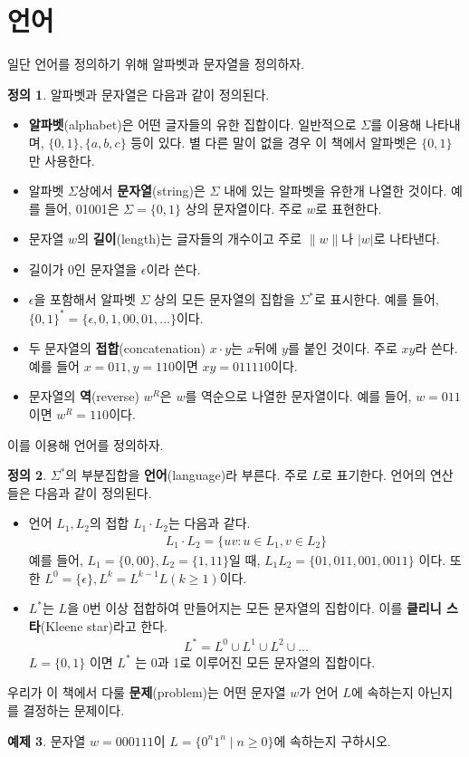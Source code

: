 \documentclass[b5paper, 11pt]{book}
\theoremstyle{definition}
\newtheorem{defn}{정의}[chapter]
\newtheorem{ex}[defn]{예제}
\begin{document}
\section{언어}
일단 언어를 정의하기 위해 알파벳과 문자열을 정의하자.
\begin{defn}
    알파벳과 문자열은 다음과 같이 정의된다.
    \begin{itemize}
        \item \textbf{알파벳}(alphabet)은 어떤 글자들의 유한 집합이다. 일반적으로 $\Sigma$를 이용해 나타내며, $\{0, 1\}, \{a, b, c\}$ 등이 있다. 별 다른 말이 없을 경우 이 책에서 알파벳은 $\{0, 1\}$만 사용한다. 
        \item 알파벳 $\Sigma$상에서 \textbf{문자열}(string)은 $\Sigma$ 내에 있는 알파벳을 유한개 나열한 것이다. 예를 들어, 01001은 $\Sigma = \{0, 1\}$ 상의 문자열이다. 주로 $w$로 표현한다. 
        \item 문자열 $w$의 \textbf{길이}(length)는 글자들의 개수이고 주로 $\| w \|$나 $\vert w \vert$로 나타낸다.
        \item 길이가 0인 문자열을 $\epsilon$이라 쓴다. 
        \item $\epsilon$을 포함해서 알파벳 $\Sigma$ 상의 모든 문자열의 집합을 $\Sigma^*$로 표시한다. 예를 들어, $\{0, 1\}^{*} = \{\epsilon , 0, 1, 00, 01 , \ldots \}$이다.
        \item 두 문자열의 \textbf{접합}(concatenation) $x \cdot y$는 $x$뒤에 $y$를 붙인 것이다. 주로 $xy$라 쓴다. 예를 들어 $x = 011, y = 110$이면 $xy = 011110$이다. 
        \item 문자열의 \textbf{역}(reverse) $w^R$은 $w$를 역순으로 나열한 문자열이다. 예를 들어, $w=011$이면 $w^R=110$이다.
    \end{itemize}
\end{defn}
이를 이용해 언어를 정의하자.
\begin{defn}
$\Sigma^*$의 부분집합을 \textbf{언어}(language)라 부른다. 주로 $L$로 표기한다. 언어의 연산들은 다음과 같이 정의된다.
\begin{itemize}
    \item 언어 $L_1, L_2$의 접합 $L_1 \cdot L_2$는 다음과 같다.
    \begin{align*}
       L_1 \cdot L_2 = \{uv: u \in L_1, v \in L_2\} 
    \end{align*}
    예를 들어, $L_1 = \{0, 00\}, L_2 = \{1, 11\}$일 때, $L_1 L_2 = \{01, 011, 001, 0011\}$ 이다. 또한 $L^0 = \{ \epsilon\}, L^{k} = L^{k-1} L (k \ge 1)$이다.  
    \item $L^*$는 $L$을 0번 이상 접합하여 만들어지는 모든 문자열의 집합이다. 이를 \textbf{클리니 스타}(Kleene star)라고 한다.
    \begin{align*}
        L^* = L^0 \cup L^1 \cup L^2 \cup \ldots 
    \end{align*}
    $L = \{0, 1\}$ 이면 $L^*$ 는 0과 1로 이루어진 모든 문자열의 집합이다. 
\end{itemize}
\end{defn}
우리가 이 책에서 다룰 \textbf{문제}(problem)는 어떤 문자열 $w$가 언어 $L$에 속하는지 아닌지를 결정하는 문제이다.
\begin{ex}
    문자열 $w = 000111$이 $L = \{0^n 1^n \;\vert\; n \ge 0\}$에 속하는지 구하시오.
\end{ex}
\end{document}
